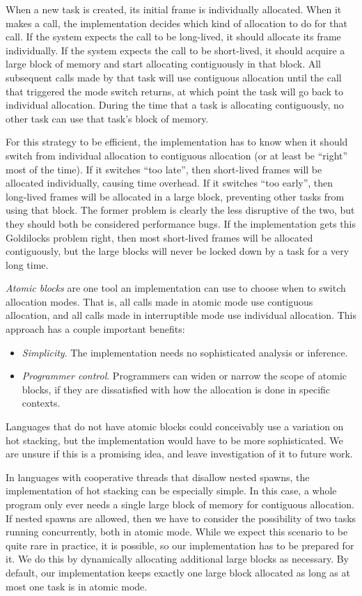 \documentclass[acmsmall,anonymous,review]{acmart}\settopmatter{printfolios=true,printccs=false,printacmref=false}
\begin{document}
When a new task is created, its initial frame is individually allocated.
When it makes a call, the implementation decides which kind of allocation to do for that call.
If the system expects the call to be long-lived, it should allocate its frame individually.
If the system expects the call to be short-lived, it should acquire a large block of memory and start allocating contiguously in that block.
All subsequent calls made by that task will use contiguous allocation until the call that triggered the mode switch returns, at which point the task will go back to individual allocation.
During the time that a task is allocating contiguously, no other task can use that task's block of memory.

For this strategy to be efficient, the implementation has to know when it should switch from individual allocation to contiguous allocation (or at least be ``right'' most of the time).
If it switches ``too late'', then short-lived frames will be allocated individually, causing time overhead.
If it switches ``too early'', then long-lived frames will be allocated in a large block, preventing other tasks from using that block.
The former problem is clearly the less disruptive of the two, but they should both be considered performance bugs.
If the implementation gets this Goldilocks problem right, then most short-lived frames will be allocated contiguously, but the large blocks will never be locked down by a task for a very long time.

\emph{Atomic blocks} are one tool an implementation can use to choose when to switch allocation modes.
That is, all calls made in atomic mode use contiguous allocation, and all calls made in interruptible mode use individual allocation.
This approach has a couple important benefits:
\begin{itemize}
\item \emph{Simplicity}.
  The implementation needs no sophisticated analysis or inference.
\item \emph{Programmer control}.
  Programmers can widen or narrow the scope of atomic blocks, if they are dissatisfied with how the allocation is done in specific contexts.
\end{itemize}

Languages that do not have atomic blocks could conceivably use a variation on hot stacking, but the implementation would have to be more sophisticated.
We are unsure if this is a promising idea, and leave investigation of it to future work.

In languages with cooperative threads that disallow nested spawns, the implementation of hot stacking can be especially simple.
In this case, a whole program only ever needs a single large block of memory for contiguous allocation.
If nested spawns are allowed, then we have to consider the possibility of two tasks running concurrently, both in atomic mode.
While we expect this scenario to be quite rare in practice, it is possible, so our implementation has to be prepared for it.
We do this by dynamically allocating additional large blocks as necessary.
By default, our implementation keeps exactly one large block allocated as long as at most one task is in atomic mode.
\end{document}
